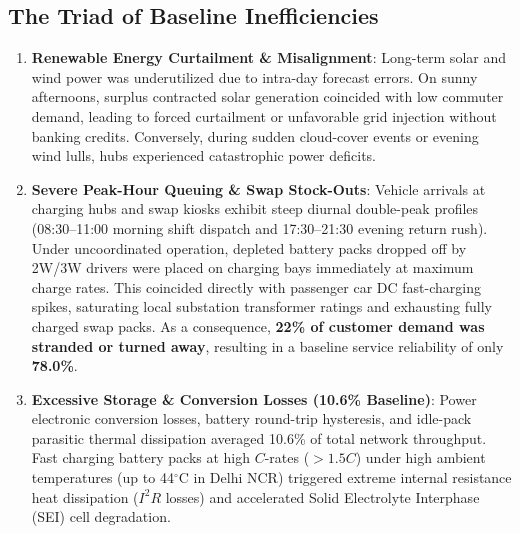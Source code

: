 \documentclass[10.5pt,a4paper]{article}
\begin{document}
\subsection{The Triad of Baseline Inefficiencies}
\begin{enumerate}
    \item \textbf{Renewable Energy Curtailment \& Misalignment}: Long-term solar and wind power was underutilized due to intra-day forecast errors. On sunny afternoons, surplus contracted solar generation coincided with low commuter demand, leading to forced curtailment or unfavorable grid injection without banking credits. Conversely, during sudden cloud-cover events or evening wind lulls, hubs experienced catastrophic power deficits.
    \item \textbf{Severe Peak-Hour Queuing \& Swap Stock-Outs}: Vehicle arrivals at charging hubs and swap kiosks exhibit steep diurnal double-peak profiles (08:30--11:00 morning shift dispatch and 17:30--21:30 evening return rush). Under uncoordinated operation, depleted battery packs dropped off by 2W/3W drivers were placed on charging bays immediately at maximum charge rates. This coincided directly with passenger car DC fast-charging spikes, saturating local substation transformer ratings and exhausting fully charged swap packs. As a consequence, \textbf{22\% of customer demand was stranded or turned away}, resulting in a baseline service reliability of only \textbf{78.0\%}.
    \item \textbf{Excessive Storage \& Conversion Losses (10.6\% Baseline)}: Power electronic conversion losses, battery round-trip hysteresis, and idle-pack parasitic thermal dissipation averaged 10.6\% of total network throughput. Fast charging battery packs at high $C$-rates ($>1.5C$) under high ambient temperatures (up to 44$^\circ$C in Delhi NCR) triggered extreme internal resistance heat dissipation ($I^2 R$ losses) and accelerated Solid Electrolyte Interphase (SEI) cell degradation.
\end{enumerate}
\end{document}
